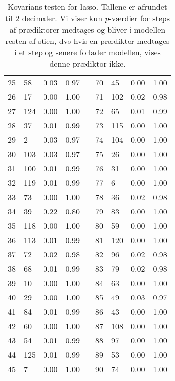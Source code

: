 \begin{table}[h]
{\begin{tabular}{lllllllll}
  25 & 58 & 0.03 & 0.97 & & 70 & 45 & 0.00 & 1.00 \\  
  26 & 17 & 0.00 & 1.00 & & 71 & 102 & 0.02 & 0.98 \\ 
  27 & 124 & 0.00 & 1.00 & & 72 & 65 & 0.01 & 0.99 \\ 
  28 & 37 & 0.01 & 0.99 & & 73 & 115 & 0.00 & 1.00 \\ 
  29 & 2 & 0.03 & 0.97 & & 74 & 104 & 0.00 & 1.00 \\ 
  30 & 103 & 0.03 & 0.97 & & 75 & 26 & 0.00 & 1.00 \\ 
  31 & 100 & 0.01 & 0.99 & & 76 & 31 & 0.00 & 1.00 \\ 
  32 & 119 & 0.01 & 0.99 & & 77 & 6 & 0.00 & 1.00 \\ 
  33 & 73 & 0.00 & 1.00 & & 78 & 36 & 0.02 & 0.98 \\ 
  34 & 39 & 0.22 & 0.80 & & 79 & 83 & 0.00 & 1.00 \\  
  35 & 118 & 0.00 & 1.00 & & 80 & 59 & 0.00 & 1.00 \\ 
  36 & 113 & 0.01 & 0.99 & & 81 & 120 & 0.00 & 1.00 \\
  37 & 72 & 0.02 & 0.98 & & 82 & 96 & 0.02 & 0.98 \\ 
  38 & 68 & 0.01 & 0.99 & & 83 & 79 & 0.02 & 0.98 \\
  39 & 10 & 0.00 & 1.00 & & 84 & 63 & 0.00 & 1.00 \\ 
  40 & 29 & 0.00 & 1.00 & & 85 & 49 & 0.03 & 0.97 \\ 
  41 & 84 & 0.01 & 0.99 & & 86 & 43 & 0.00 & 1.00 \\ 
  42 & 60 & 0.00 & 1.00 & & 87 & 108 & 0.00 & 1.00 \\ 
  43 & 54 & 0.01 & 0.99 & & 88 & 97 & 0.00 & 1.00 \\ 
  44 & 125 & 0.01 & 0.99 & & 89 & 53 & 0.00 & 1.00 \\ 
  45 & 7 & 0.00 & 1.00 & & 90 & 74 & 0.00 & 1.00 \\ 
\bottomrule
\end{tabular}
}
\caption{Kovarians testen for lasso.
Tallene er afrundet til 2 decimaler.
Vi viser kun \(p\)-værdier for steps af prædiktorer medtages og bliver i modellen resten af stien, dvs hvis en prædiktor medtages i et step og senere forlader modellen, vises denne prædiktor ikke.} \label{tab:covTest}
\end{table} 
